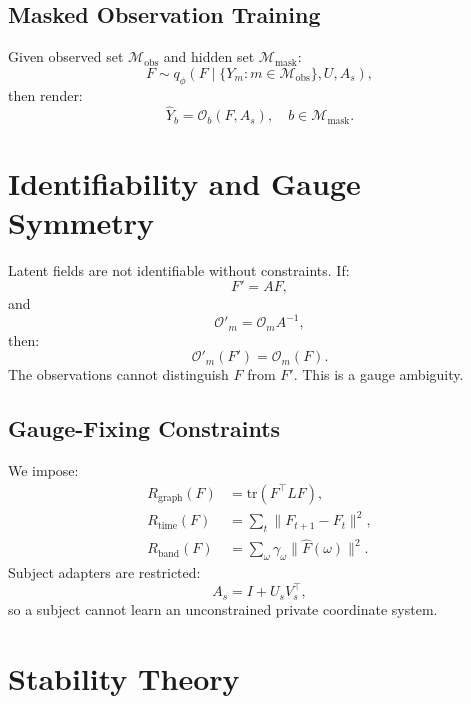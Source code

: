 \documentclass[11pt]{article}
\newcommand{\tr}{\mathrm{tr}}
\newcommand{\Obs}{\mathcal{O}}
\begin{document}
\subsection{Masked Observation Training}

Given observed set $\mathcal{M}_{\mathrm{obs}}$ and hidden set $\mathcal{M}_{\mathrm{mask}}$:
\begin{equation}
F\sim q_\phi(F\mid \{Y_m:m\in\mathcal{M}_{\mathrm{obs}}\},U,A_s),
\end{equation}
then render:
\begin{equation}
\hat{Y}_b=\Obs_b(F,A_s), \quad b\in\mathcal{M}_{\mathrm{mask}}.
\end{equation}

\section{Identifiability and Gauge Symmetry}

Latent fields are not identifiable without constraints. If:
\begin{equation}
F'=AF,
\end{equation}
and
\begin{equation}
\Obs'_m=\Obs_mA^{-1},
\end{equation}
then:
\begin{equation}
\Obs'_m(F')=\Obs_m(F).
\end{equation}
The observations cannot distinguish $F$ from $F'$. This is a gauge ambiguity.

\subsection{Gauge-Fixing Constraints}

We impose:
\begin{align}
R_{\mathrm{graph}}(F)&=\tr(F^\top LF),\\
R_{\mathrm{time}}(F)&=\sum_t\|F_{t+1}-F_t\|^2,\\
R_{\mathrm{band}}(F)&=\sum_\omega \gamma_\omega\|\hat{F}(\omega)\|^2.
\end{align}
Subject adapters are restricted:
\begin{equation}
A_s=I+U_sV_s^\top,
\end{equation}
so a subject cannot learn an unconstrained private coordinate system.

\section{Stability Theory}
\end{document}
